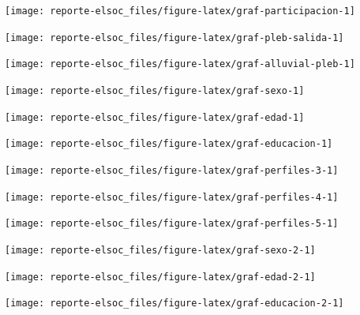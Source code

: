 \documentclass[
  12pt,
]{book}
\begin{document}
\begin{center}\texttt{[image: reporte-elsoc\_files/figure-latex/graf-participacion-1]} \end{center}

\begin{center}\texttt{[image: reporte-elsoc\_files/figure-latex/graf-pleb-salida-1]} \end{center}

\begin{center}\texttt{[image: reporte-elsoc\_files/figure-latex/graf-alluvial-pleb-1]} \end{center}

\begin{center}\texttt{[image: reporte-elsoc\_files/figure-latex/graf-sexo-1]} \end{center}

\begin{center}\texttt{[image: reporte-elsoc\_files/figure-latex/graf-edad-1]} \end{center}

\begin{center}\texttt{[image: reporte-elsoc\_files/figure-latex/graf-educacion-1]} \end{center}

\begin{center}\texttt{[image: reporte-elsoc\_files/figure-latex/graf-perfiles-3-1]} \end{center}

\begin{center}\texttt{[image: reporte-elsoc\_files/figure-latex/graf-perfiles-4-1]} \end{center}

\begin{center}\texttt{[image: reporte-elsoc\_files/figure-latex/graf-perfiles-5-1]} \end{center}

\begin{center}\texttt{[image: reporte-elsoc\_files/figure-latex/graf-sexo-2-1]} \end{center}

\begin{center}\texttt{[image: reporte-elsoc\_files/figure-latex/graf-edad-2-1]} \end{center}

\begin{center}\texttt{[image: reporte-elsoc\_files/figure-latex/graf-educacion-2-1]} \end{center}
\end{document}
